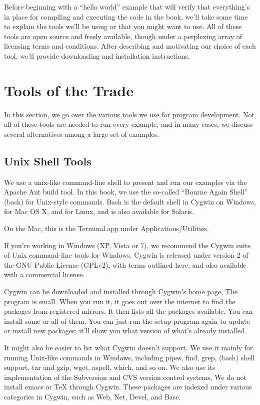 Before beginning with a ``hello world'' example that will verify that
everything's in place for compiling and executing the code in the
book, we'll take some time to explain the tools we'll be using or that
you might want to use.  All of these tools are open source and freely
available, though under a perplexing array of licensing terms and
conditions.  After describing and motivating our choice of each tool,
we'll provide downloading and installation instructions.

\section{Tools of the Trade}

In this section, we go over the various tools we use for program
development.  Not all of these tools are needed to run every example,
and in many cases, we discuss several alternatives among a large
set of examples.  


\subsection{Unix Shell Tools}

We use a unix-like command-line shell to present and run our examples
via the Apache Ant build tool.
In this book, we use the so-called ``Bourne Again Shell'' (bash) for
Unix-style commands.  Bash is the default shell in Cygwin on Windows,
for Mac OS X, and for Linux, and is also available for Solaris.

On the Mac, this is the Terminal.app under Applications/Utilities.

If you're working in Windows (XP, Vista or 7), we recommend the 
Cygwin suite of Unix command-line tools for Windows.  
Cygwin is released under version 2 of the GNU Public License (GPLv2), with
terms outlined here:
%
%
and also available with a commercial license.

Cygwin can be downloaded and installed through Cygwin's home page,
%
%
The  program is small.  When you run it, it goes out
over the internet to find the packages from registered mirrors.  It
then lists all the packages available.  You can install some or all of
them.  You can just run the setup program again to update or install
new packages; it'll show you what version of what's already installed.

It might also be easier to list what Cygwin doesn't support.  We use
it mainly for running Unix-like commands in Windows, including pipes,
find, grep, (bash) shell support, tar and gzip, wget, aspell, which,
and so on.  We also use its implementation of the Subversion and CVS
version control systems.  We do not install emacs or TeX through
Cygwin.  These packages are indexed under various categories in
Cygwin, such as Web, Net, Devel, and Base.  

